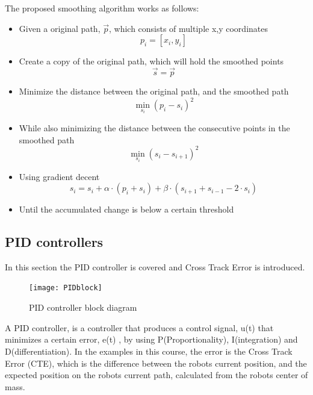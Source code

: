 \documentclass[Main]{subfiles}
\begin{document}
The proposed smoothing algorithm works as follows:
\begin{itemize}
	\item Given a original path, $\overrightarrow{p}$, which consists of multiple x,y coordinates
	\begin{equation}
		p_i = [x_i,y_i]
	\end{equation}
	\item Create a copy of the original path, which will hold the smoothed points
	\begin{equation}
		\overrightarrow{s} = \overrightarrow{p}
	\end{equation}
	\item Minimize the distance between the original path, and the smoothed path
	\begin{equation}
		\min_{s_i}(p_i-s_i)^2
	\end{equation}
	\item While also minimizing the distance between the consecutive points in the smoothed path
	\begin{equation}
		\min_{s_i}(s_i-s_{i+1})^2
	\end{equation}
	\item Using gradient decent
	\begin{equation}
		s_i = s_i + \alpha \cdot (p_i + s_i) + \beta \cdot (s_{i+1} + s_{i-1} - 2 \cdot s_i)
	\end{equation}
	\item Until the accumulated change is below a certain threshold
\end{itemize}

\subsection{PID controllers}
In this section the PID controller is covered and Cross Track Error is introduced.
\begin{figure}[H]
	\centering
	\texttt{[image: PIDblock]}
	\caption{PID controller block diagram}
	\label{fig:pid_controller}
\end{figure}\noindent
A PID controller, is a controller that produces a control signal, u(t)  that minimizes a certain error, e(t) , by using P(Proportionality), I(integration) and D(differentiation). 
In the examples in this course, the error is the Cross Track Error (CTE), which is the difference between the robots current position, and the expected position on the robots current path, calculated from the robots center of mass.
\end{document}
